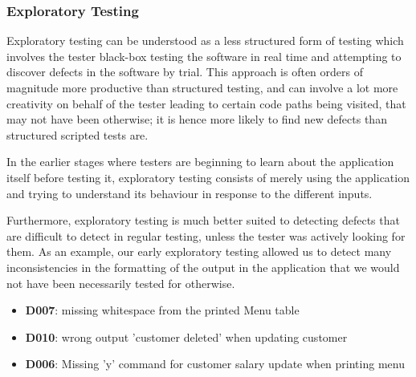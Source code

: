 \subsubsection{Exploratory Testing}

Exploratory testing can be understood as a less structured form of testing which involves the tester black-box testing the software in real time and attempting to discover defects in the software by trial. 
This approach is often orders of magnitude more productive than structured testing, and can involve a lot more creativity on behalf of the tester leading to certain code paths being visited, that may not have been otherwise; it is hence more likely to find new defects than structured scripted tests are.
\par
In the earlier stages where testers are beginning to learn about the application itself before testing it, exploratory testing consists of merely using the application and trying to understand its behaviour in response to the different inputs. 
\par
Furthermore, exploratory testing is much better suited to detecting defects that are difficult to detect in regular testing, unless the tester was actively looking for them. 
As an example, our early exploratory testing allowed us to detect many inconsistencies in the formatting of the output in the application that we would not have been necessarily tested for otherwise.  

\begin{itemize}
    \item \textbf{D007}: missing whitespace from the printed Menu table
    \item \textbf{D010}: wrong output 'customer deleted' when updating customer
    \item \textbf{D006}: Missing 'y' command for customer salary update when printing menu
\end{itemize}